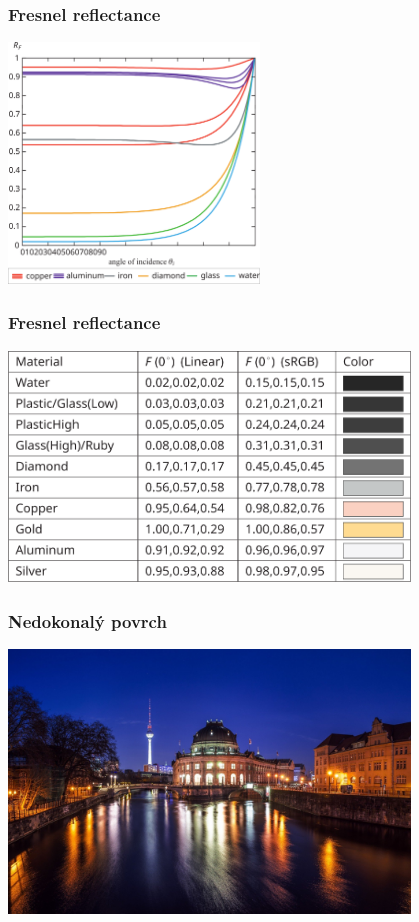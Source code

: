 \begin{frame}
    \frametitle{Fresnel reflectance}
    \includegraphics[width=0.5\textwidth]{pics/physicallyBasedRendering/fresnel_reflectance}
\end{frame}

\begin{frame}
    \frametitle{Fresnel reflectance}
    \includegraphics[width=0.8\textwidth]{pics/physicallyBasedRendering/fresnel_reflectance_table}
\end{frame}

\begin{frame}
    \frametitle{Nedokonalý povrch}
    \includegraphics[width=0.8\textwidth]{pics/physicallyBasedRendering/night-reflect}
\end{frame}

